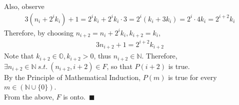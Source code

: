 \documentclass[12pt]{article}
\begin{document}
Also, observe
\begin{gather*}
3(n_i + 2^i k_i) + 1 = 2^i k_i + 2^i k_i \cdot 3 = 2^i \left( k_i + 3 k_i\right) = 2^i \cdot 4 k_i = 2^{i+2} k_i
\end{gather*}
Therefore, by choosing $n_{i+2} = n_i + 2^i k_i,k_{i+2} = k_i$,
\begin{gather*}
3 n_{i+2} + 1 = 2^{i+2} k_{i+2}
\end{gather*}
Note that $k_{i+2} \in \mathbb{O}, k_{i+2} > 0$, thus $n_{i+2} \in \mathbb{N}$. Therefore, $\exists n_{i+2} \in \mathbb{N} ~s.t.~ (n_{i+2}, i+2) \in F$, so that $P(i+2)$ is true.\\[1em]
By the Principle of Mathematical Induction, $P(m)$ is true for every $m \in (\mathbb{N} \cup \{0\})$.\\[1em]
From the above, $F$ is onto.~$\blacksquare$
\end{document}
